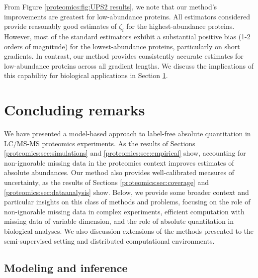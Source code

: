 From Figure \ref{proteomics:fig:UPS2 results}, we note that our method's improvements are greatest for low-abundance proteins.
All estimators considered provide reasonably good estimates of $\zeta_i$ for the highest-abundance proteins.
However, most of the standard estimators exhibit a substantial positive bias (1-2 orders of magnitude) for the lowest-abundance proteins, particularly on short gradients.
In contrast, our method provides consistently accurate estimates for low-abundance proteins across all gradient lengths.
We discuss the implications of this capability for biological applications in Section \ref{proteomics:sec:remarks}.




\section{Concluding remarks}
\label{proteomics:sec:remarks}

We have presented a model-based approach to label-free absolute quantitation in LC/MS-MS proteomics experiments.
As the results of Sections \ref{proteomics:sec:simulations} and \ref{proteomics:sec:empirical} show, accounting for non-ignorable missing data in the proteomics context improves estimates of absolute abundances.
Our method also provides well-calibrated measures of uncertainty, as the results of Sections \ref{proteomics:sec:coverage} and \ref{proteomics:sec:dataanalysis} show.
Below, we provide some broader context and particular insights on this class of methods and problems, focusing on the role of non-ignorable missing data in complex experiments, efficient computation with missing data of variable dimension, and the role of absolute quantitation in biological analyses.
We also discussion extensions of the methods presented to the semi-supervised setting and distributed computational environments.

\subsection{Modeling and inference}


